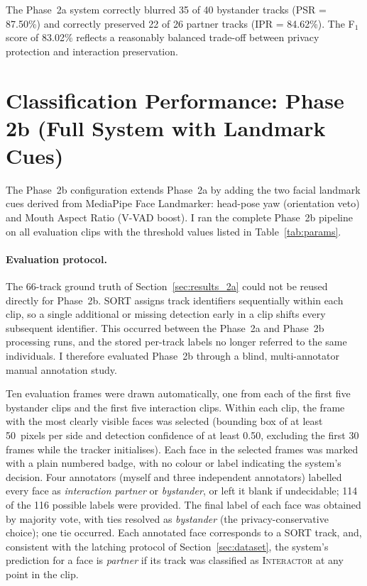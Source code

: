 The Phase~2a system correctly blurred 35 of 40 bystander tracks (PSR = 87.50\%) and
correctly preserved 22 of 26 partner tracks (IPR = 84.62\%). The F$_1$ score of
83.02\% reflects a reasonably balanced trade-off between privacy protection and
interaction preservation.

\section{Classification Performance: Phase 2b (Full System with Landmark Cues)}
\label{sec:results_2b}

The Phase~2b configuration extends Phase~2a by adding the two facial landmark
cues derived from MediaPipe Face Landmarker: head-pose yaw (orientation veto) and
Mouth Aspect Ratio (V-VAD boost). I ran the complete Phase~2b pipeline on all
evaluation clips with the threshold values listed in Table~\ref{tab:params}.

\paragraph{Evaluation protocol.}
The 66-track ground truth of Section~\ref{sec:results_2a} could not be reused directly for Phase~2b.
SORT assigns track identifiers sequentially within each clip, so a single additional
or missing detection early in a clip shifts every subsequent identifier. This
occurred between the Phase~2a and Phase~2b processing runs, and the stored per-track
labels no longer referred to the same individuals. I therefore evaluated Phase~2b
through a blind, multi-annotator manual annotation study.

Ten evaluation frames were drawn automatically, one from each of the first five
bystander clips and the first five interaction clips. Within each clip, the frame
with the most clearly visible faces was selected (bounding box of at least
50~pixels per side and detection confidence of at least 0.50, excluding the first
30 frames while the tracker initialises). Each face in the selected frames was
marked with a plain numbered badge, with no colour or label indicating the system's
decision. Four annotators (myself and three independent annotators)
labelled every face as \emph{interaction partner} or \emph{bystander}, or left it
blank if undecidable; 114 of the 116 possible labels were provided. The final label
of each face was obtained by majority vote, with ties resolved as \emph{bystander}
(the privacy-conservative choice); one tie occurred. Each annotated face corresponds
to a SORT track, and, consistent with the latching protocol of Section~\ref{sec:dataset}, the
system's prediction for a face is \emph{partner} if its track was classified as
\textsc{Interactor} at any point in the clip.


